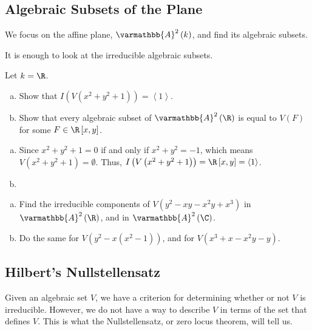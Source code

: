 \documentclass[10pt]{mypackage}
\renewcommand*{\mathbb}[1]{\varmathbb{#1}}
\newcommand{\A}{\mathbb{A}}
\begin{document}
\subsection{Algebraic Subsets of the Plane}%
We focus on the affine plane, $\A^2\left( k \right)$, and find its algebraic subsets.\newline

It is enough to look at the irreducible algebraic subsets.
\begin{exercise}[Exercise 1.30]
Let $k = \R$. 
\begin{enumerate}[(a)]
  \item Show that $I\left(V\left(x^2 + y^2 + 1\right)\right) = \left\langle 1 \right\rangle$.
  \item Show that every algebraic subset of $\A^2\left(\R\right)$ is equal to $V(F)$ for some $F\in \R\left[x,y\right]$.
\end{enumerate}
\end{exercise}
\begin{solution}\hfill
  \begin{enumerate}[(a)]
    \item Since $x^2 + y^2 + 1 = 0$ if and only if $x^2 + y^2 = -1$, which means $V\left(x^2 + y^2 + 1\right) = \emptyset$. Thus, $I\left( V\left( x^2 + y^2 + 1 \right) \right) = \R\left[ x,y \right] = \left\langle 1 \right\rangle$.
    \item \color{red}{Consult Brown.}
  \end{enumerate}
\end{solution}

\begin{exercise}[Exercise 1.31]\hfill
  \begin{enumerate}[(a)]
    \item Find the irreducible components of $V\left( y^2 - xy - x^2y + x^3 \right)$ in $\A^2\left( \R \right)$, and in $\A^2\left( \C \right)$.
    \item Do the same for $V\left( y^2 - x\left( x^2 - 1 \right) \right)$, and for $V\left( x^3 + x - x^2 y - y \right)$.
  \end{enumerate}
\end{exercise}
\subsection{Hilbert's Nullstellensatz}%
Given an algebraic set $V$, we have a criterion for determining whether or not $V$ is irreducible. However, we do not have a way to describe $V$ in terms of the set that defines $V$. This is what the Nullstellensatz, or zero locus theorem, will tell us.\newline
\end{document}
